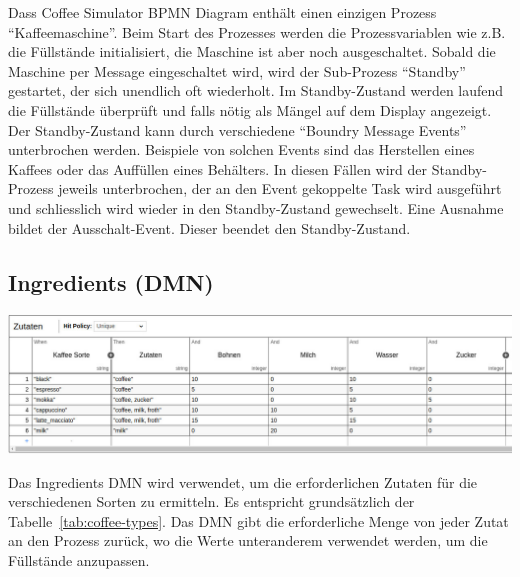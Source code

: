 Dass Coffee Simulator BPMN Diagram enthält einen einzigen Prozess ``Kaffeemaschine''.
Beim Start des Prozesses werden die Prozessvariablen wie z.B. die Füllstände initialisiert, die Maschine ist aber noch ausgeschaltet.
Sobald die Maschine per Message eingeschaltet wird, wird der Sub-Prozess ``Standby'' gestartet, der sich unendlich oft wiederholt.
Im Standby-Zustand werden laufend die Füllstände überprüft und falls nötig als Mängel auf dem Display angezeigt.
Der Standby-Zustand kann durch verschiedene ``Boundry Message Events'' unterbrochen werden.
Beispiele von solchen Events sind das Herstellen eines Kaffees oder das Auffüllen eines Behälters.
In diesen Fällen wird der Standby-Prozess jeweils unterbrochen, der an den Event gekoppelte Task wird ausgeführt und schliesslich wird wieder in den Standby-Zustand gewechselt.
Eine Ausnahme bildet der Ausschalt-Event.
Dieser beendet den Standby-Zustand.

\subsection{Ingredients (DMN)}\label{subsec:ingredients-(dmn)}
\begin{center}
    \includegraphics[width=1\textwidth]{resources/coffe_simulator_dmn}
\end{center}
Das Ingredients DMN wird verwendet, um die erforderlichen Zutaten für die verschiedenen Sorten zu ermitteln.
Es entspricht grundsätzlich der Tabelle~\ref{tab:coffee-types}.
Das DMN gibt die erforderliche Menge von jeder Zutat an den Prozess zurück, wo die Werte unteranderem verwendet werden, um die Füllstände anzupassen.


